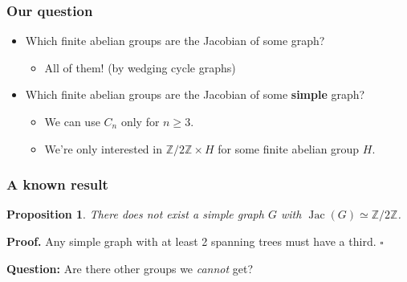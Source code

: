 \documentclass[mathserif, serif, xcolor=dvipsnames]{beamer}
\newtheorem{prop}{Proposition}
\newcommand{\Z}{\ensuremath{\mathbb{Z}}}
\DeclareMathOperator{\Jac}{Jac}
\begin{document}
\begin{frame}
  \frametitle{Our question} 

  \begin{itemize}
  \item
    Which finite abelian groups are the Jacobian of some graph?  

\medskip
  \pause

  \begin{itemize}
  \item All of them! (by wedging cycle graphs)
  \end{itemize}

\medskip
  \pause
\item
  Which finite abelian groups are the Jacobian of some \textbf{simple}
  graph?
  \medskip
  \pause
  \begin{itemize}
  \item We can use $C_n$ only for $n\ge3$.
   \medskip
  \item We're only interested in $\Z/2\Z\times H$ for some finite abelian group $H$. 
  \end{itemize}
  
\end{itemize}
  
\end{frame}

\begin{frame}
 \frametitle{A known result} 
  \begin{prop}
    There does not exist a simple graph $G$ with $\Jac(G) \simeq \Z/2\Z$. 
  \end{prop}
 \vspace{0.3cm}
 
 \pause
  
 \textbf{Proof.} Any simple graph with at least 2 spanning trees must have a third. $\square$

  \pause 

  \vspace{1.8cm}

  \textbf{Question:} Are there other groups we \emph{cannot} get?
\end{frame}
\end{document}
